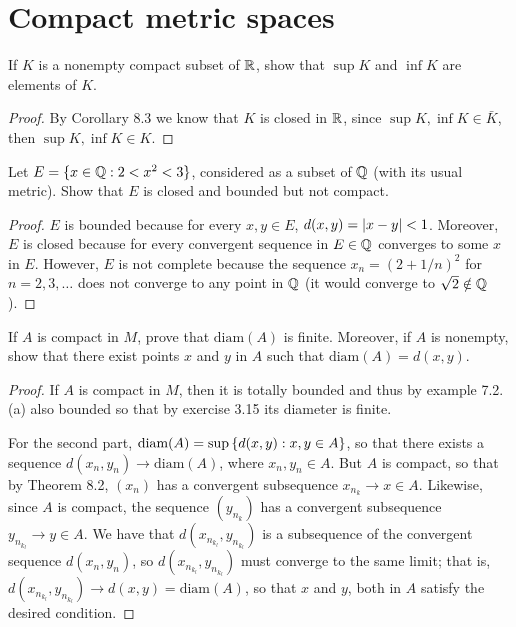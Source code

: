 \section{Compact metric spaces}


\begin{exercise}{1}
If $K$ is a nonempty compact subset of $\mathbb{R}$, show that $\sup K$ and $\inf K$ are elements of $K$.
\end{exercise}
\begin{proof}
By Corollary 8.3 we know that $K$ is closed in $\mathbb{R}$, since $\sup K,\inf K\in \bar{K}$, then $\sup K, \inf K\in K$.
\end{proof} 

\begin{exercise}{2}
Let $E=\{x\in\mathbb{Q}: 2<x^2<3\}$, considered as a subset of $\mathbb{Q}$ (with its usual metric).
Show that $E$ is closed and bounded but not compact.
\end{exercise}
\begin{proof}
$E$ is bounded because for every $x,y\in E$, $d(x,y)=\left\lvert x-y\right\rvert<1$.
Moreover, $E$ is closed because for every convergent sequence in $E\in\mathbb{Q}$ converges to some $x$ in $E$.
However, $E$ is not complete because the sequence $x_n = (2+1/n)^2$ for $n=2,3,\dots$ does not converge to any point in $\mathbb{Q}$ (it would converge to $\sqrt{2}\notin \mathbb{Q}$).
\end{proof} 

\begin{exercise}{3}
If $A$ is compact in $M$, prove that $\text{diam}(A)$ is finite.
Moreover, if $A$ is nonempty, show that there exist points $x$ and $y$ in $A$ such that $\text{diam}(A)=d(x,y)$.
\end{exercise}
\begin{proof}
If $A$ is compact in $M$, then it is totally bounded and thus by example 7.2.(a) also bounded so that by exercise 3.15 its diameter is finite.

For the second part, $\text{diam}(A)=\sup{\{d(x,y):x,y\in A\}}$, so that there exists a sequence $d(x_n,y_n)\to \text{diam}(A)$, where $x_n,y_n\in A$.
But $A$ is compact, so that by Theorem 8.2, $(x_n)$ has a convergent subsequence $x_{n_k}\to x\in A$.
Likewise, since $A$ is compact, the sequence $(y_{n_k})$ has a convergent subsequence $y_{n_{k_l}}\to y \in A$.
We have that $d(x_{n_{k_l}}, y_{n_{k_l}})$ is a subsequence of the convergent sequence $d(x_n,y_n)$, so $d(x_{n_{k_l}}, y_{n_{k_l}})$ must converge to the same limit;
that is, $d(x_{n_{k_l}}, y_{n_{k_l}}) \to d(x,y) = \text{diam}(A)$, so that $x$ and $y$, both in $A$ satisfy the desired condition. 
\end{proof} 

